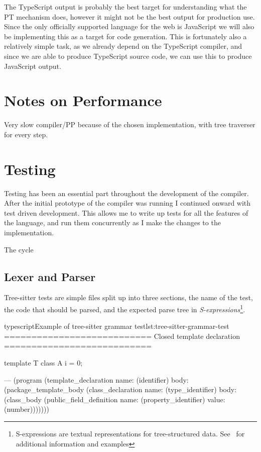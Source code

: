 The TypeScript output is probably the best target for understanding what the PT mechanism does, however it might not be the best output for production use.
Since the only officially supported language for the web is JavaScript we will also be implementing this as a target for code generation.
This is fortunately also a relatively simple task, as we already depend on the TypeScript compiler, and since we are able to produce TypeScript source code, we can use this to produce JavaScript output.

\section{Notes on Performance}\label{sec:notes-on-performance}

Very slow compiler/PP because of the chosen implementation, with tree traverser for every step.


\section{Testing}\label{sec:testing}

Testing has been an essential part throughout the development of the compiler.
After the initial prototype of the compiler was running I continued onward with test driven development.
This allows me to write up tests for all the features of the language, and run them concurrently as I make the changes to the implementation.

The cycle

\subsection{Lexer and Parser}\label{subsec:testing-lexer-and-parser}

Tree-sitter tests are simple  files split up into three sections, the name of the test, the code that should be parsed, and the expected parse tree in \textit{S-expressions}\footnote{S-expressions are textual representations for tree-structured data. See~\cite{sexprs} for additional information and examples}.

\begin{code}{typescript}{Example of tree-sitter grammar test}{lst:tree-sitter-grammar-test}
    ===========================
    Closed template declaration
    ===========================

    template T {
        class A {
            i = 0;
        }
    }

    ---
    (program
        (template_declaration
            name: (identifier)
            body: (package_template_body
                    (class_declaration
                        name: (type_identifier)
                        body: (class_body
                            (public_field_definition
                                name: (property_identifier)
                                value: (number)))))))

\end{code}

